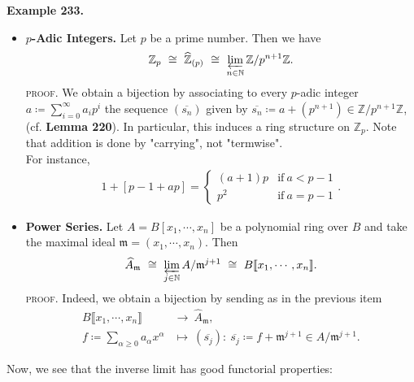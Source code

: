 \documentclass[12pt,a4paper,footinclude=true,headinclude=true]{scrbook} %
\newenvironment{example}[2][Example]
    { \begin{mdframed}[backgroundcolor=gray!20] \textbf{#1 #2.} }
    {  \end{mdframed}}
\begin{document}
\begin{example}{233}
    \begin{itemize}
        \item[(a)] \textbf{$p$-Adic Integers.} Let $p$ be a prime number. Then we have
        \begin{align*}
            \mathbb{Z}_p\ \cong\ \widehat{\mathbb{Z}}_{(p)}\ \cong\ \varprojlim_{n\in\mathbb{N}}\mathbb{Z}/p^{n+1}\mathbb{Z}.
        \end{align*}
        \textsc{proof.} We obtain a bijection by associating to every $p$-adic integer $a\coloneqq\sum_{i=0}^\infty a_ip^i$ the sequence $(\overline{s_n})$ given by $\overline{s_n}\coloneqq a+(p^{n+1})\in\mathbb{Z}/p^{n+1}\mathbb{Z}$, (cf. \textbf{Lemma 220}). In particular, this induces a ring structure on $\mathbb{Z}_p$. Note that addition is done by "carrying", not "termwise". \\
        For instance, 
        \begin{align*}
            1+[p-1+ap]= \left\{\begin{array}{lc} (a+1)p &\text{if}\ a<p-1 \\ 
            p^2 &\text{if}\ a=p-1 \end{array}\right..
        \end{align*}
        \item[(b)] \textbf{Power Series.} Let $A=B[x_1,\cdots,x_n]$ be a polynomial ring over $B$ and take the maximal ideal $\mathfrak{m}=(x_1,\cdots,x_n)$. Then
        \begin{align*}
            \widehat{A}_\mathfrak{m}\ \cong\ \varprojlim_{j\in\mathbb{N}}A/\mathfrak{m}^{j+1}\ \cong\ B\llbracket x_1,\cdots,x_n\rrbracket.
        \end{align*}
        \textsc{proof.} Indeed, we obtain a bijection by sending as in the previous item 
        \begin{align*}
            B\llbracket x_1,\cdots,x_n\rrbracket &\longrightarrow\ \widehat{A}_\mathfrak{m},\\ f\coloneqq\sum_{\alpha\geq0}a_{\alpha}x^\alpha &\longmapsto\ (\overline{s_j}):\ \overline{s_j}\coloneqq  f+\mathfrak{m}^{j+1}\in A/\mathfrak{m}^{j+1}.
        \end{align*}
    \end{itemize}
\end{example}
\newpage
Now, we see that the inverse limit has good functorial properties:
\end{document}
